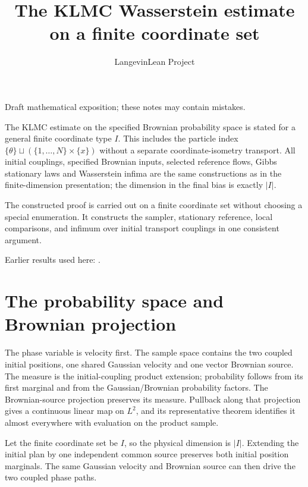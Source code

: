 \documentclass[11pt,a4paper]{article}
\title{\texorpdfstring{The KLMC Wasserstein estimate on a finite coordinate set}{The KLMC Wasserstein estimate on a finite coordinate set}}
\author{LangevinLean Project}
\date{}
\begin{document}
\maketitle
Draft mathematical exposition; these notes may contain mistakes.


The KLMC estimate on the specified Brownian probability space is stated for a general finite coordinate type \(I\). This includes the particle index \(\{\theta\}\sqcup(\{1,\ldots,N\}\times\{x\})\) without a separate coordinate-isometry transport. All initial couplings, specified Brownian inputs, selected reference flows, Gibbs stationary laws and Wasserstein infima are the same constructions as in the finite-dimension presentation; the dimension in the final bias is exactly \(|I|\).



The constructed proof is carried out on a finite coordinate set without choosing a special enumeration. It constructs the sampler, stationary reference, local comparisons, and infimum over initial transport couplings in one consistent argument.



Earlier results used here: \cite[Section~3.18]{LangevinLean2026ULASC}.

\section{\texorpdfstring{The probability space and Brownian projection}{The probability space and Brownian projection}}


The phase variable is velocity first. The sample space contains the two coupled initial positions, one shared Gaussian velocity and one vector Brownian source. The measure is the initial-coupling product extension; probability follows from its first marginal and from the Gaussian/\allowbreak{}Brownian probability factors. The Brownian-source projection preserves its measure. Pullback along that projection gives a continuous linear map on \(L^{2}\), and its representative theorem identifies it almost everywhere with evaluation on the product sample.



Let the finite coordinate set be \(I\), so the physical dimension is \(|I|\). Extending the initial plan by one independent common source preserves both initial position marginals. The same Gaussian velocity and Brownian source can then drive the two coupled phase paths.
\end{document}
